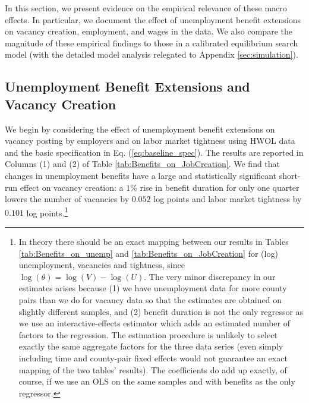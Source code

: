 \documentclass[12pt]{article}
\newcommand{\1}{\mathbf{1}}
\begin{document}
In this section, we present evidence on the empirical relevance of these macro effects. In particular, we document the effect of unemployment benefit extensions on vacancy creation, employment, and wages in the data. We also compare the magnitude of these empirical findings to those in a calibrated equilibrium search model (with the detailed model analysis relegated to Appendix \ref{sec:simulation}).


\subsection{Unemployment Benefit Extensions and Vacancy Creation}
\label{sec:vacancy}
We begin by considering the effect of unemployment benefit extensions on vacancy posting by employers and on labor market tightness using HWOL data and the basic specification in Eq. (\ref{eq:baseline_spec}). The results are reported in Columns (1) and (2) of Table \ref{tab:Benefits_on_JobCreation}. We find that changes in unemployment benefits have a large and statistically significant short-run effect on vacancy creation: a $1\%$ rise in benefit duration for only one quarter lowers the number of vacancies by $0.052$ log points and labor market tightness by $0.101$ log points.\footnote{In theory there should be an exact mapping between our results in Tables \ref{tab:Benefits_on_unemp} and \ref{tab:Benefits_on_JobCreation} for (log) unemployment, vacancies and tightness, since $\log(\theta) = \log(V) - \log(U)$. The very minor discrepancy in our estimates arises because (1) we have unemployment data for more county pairs than we do for vacancy data so that the estimates are obtained on slightly different samples, and (2) benefit duration is not the only regressor as we use an interactive-effects estimator \citep{bai:09} which adds an estimated number of factors to the regression. The estimation procedure is unlikely to select exactly the same aggregate factors for the three data series (even simply including time and county-pair fixed effects would not guarantee an exact mapping of the two tables' results). The coefficients do add up exactly, of course, if we use an OLS on the same samples and with benefits as the only regressor.}


\begin{table}[t]
  \centering
   \caption{Unemployment Benefit Extensions and Job Creation} \label{tab:Benefits_on_JobCreation}
\small

\vspace{-0.2cm}
\end{table}
\end{document}
